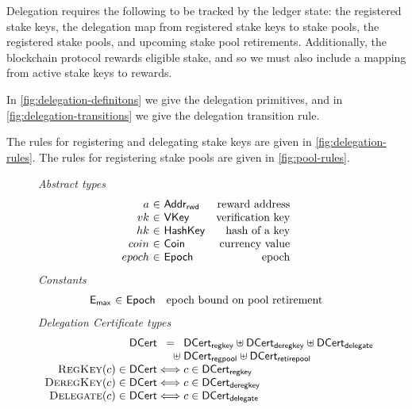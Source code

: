 \documentclass[11pt,a4paper]{article}
\newcommand{\uniondistinct}{\uplus}
\newcommand{\type}[1]{\mathsf{#1}}
\newcommand{\AddrRWD}{\type{Addr_{rwd}}}
\newcommand{\VKey}{\type{VKey}}
\newcommand{\HashKey}{\type{HashKey}}
\newcommand{\Coin}{\type{Coin}}
\newcommand{\Epoch}{\type{Epoch}}
\newcommand{\DCert}{\type{DCert}}
\newcommand{\DCertRegKey}{\type{DCert_{regkey}}}
\newcommand{\DCertDeRegKey}{\type{DCert_{deregkey}}}
\newcommand{\DCertDeleg}{\type{DCert_{delegate}}}
\newcommand{\DCertRegPool}{\type{DCert_{regpool}}}
\newcommand{\DCertRetirePool}{\type{DCert_{retirepool}}}
\newcommand{\RegKey}[1]{\textsc{RegKey}(#1)}
\newcommand{\DeregKey}[1]{\textsc{DeregKey}(#1)}
\newcommand{\Delegate}[1]{\textsc{Delegate}(#1)}
\newcommand{\emax}{\mathsf{E_{max}}}
\begin{document}
Delegation requires the following to be tracked by the ledger state:
the registered stake keys, the delegation map from registered stake keys to stake
pools, the registered stake pools, and upcoming stake pool retirements.
Additionally, the blockchain protocol rewards eligible stake, and so we must
also include a mapping from active stake keys to rewards.

In \cref{fig:delegation-definitons} we give the delegation primitives,
and in \cref{fig:delegation-transitions} we give the delegation transition rule.

The rules for registering and delegating stake keys are given in \cref{fig:delegation-rules}.
The rules for registering stake pools are given in \cref{fig:pool-rules}.

\begin{figure}
  \emph{Abstract types}
  \begin{equation*}
    \begin{array}{r@{~\in~}lr}
      a & \AddrRWD & \text{reward address} \\
      vk & \VKey & \text{verification key} \\
      hk & \HashKey & \text{hash of a key} \\
      coin & \Coin & \text{currency value} \\
      epoch & \Epoch & \text{epoch}
    \end{array}
  \end{equation*}
  \emph{Constants}
  \begin{equation*}
    \begin{array}{r@{~\in~}lr}
      \emax & \Epoch & \text{epoch bound on pool retirement}
    \end{array}
  \end{equation*}
  \emph{Delegation Certificate types}
  \begin{equation*}
  \begin{array}{r@{}c@{}l}
    \DCert &=& \DCertRegKey \uniondistinct \DCertDeRegKey \uniondistinct \DCertDeleg \\
                &\hfill\uniondistinct\;& \DCertRegPool \uniondistinct \DCertRetirePool \\
    \RegKey{c} \in \DCert &\iff& c \in \DCertRegKey \\
    \DeregKey{c} \in \DCert &\iff& c \in \DCertDeRegKey \\
    \Delegate{c} \in \DCert &\iff& c \in \DCertDeleg \\

\end{array}
\end{equation*}
\end{figure}
\end{document}
